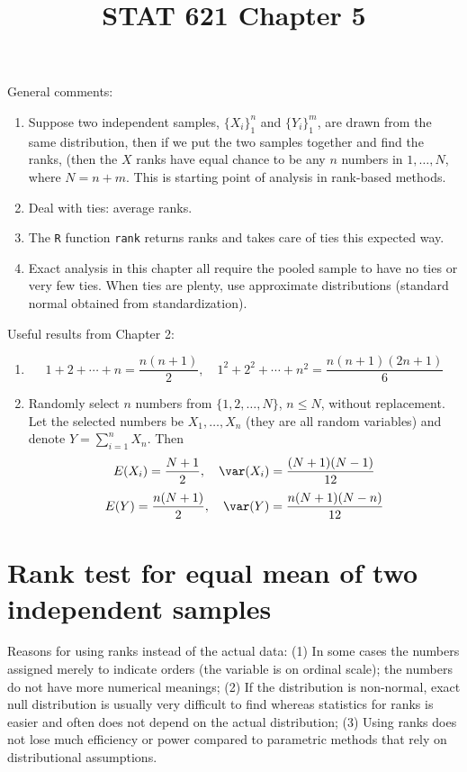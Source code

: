 \documentclass[12pt]{article}
\begin{document}
\title{STAT 621 Chapter 5}
\maketitle

General comments:
\begin{enumerate}
\item Suppose two independent samples,
    $\{X_i\}_1^n$ and $\{Y_i\}_1^m$,
    are drawn from the same distribution, then
    if we put the two samples together and find the ranks,
    (then the $X$ ranks have equal chance to be any
    $n$ numbers in $1,\dotsc,N$, where $N=n+m$.
    This is starting point of analysis in rank-based methods.
\item Deal with ties: average ranks.
\item The \texttt{R} function \texttt{rank} returns ranks
    and takes care of ties this expected way.
\item Exact analysis in this chapter all require the pooled sample to
    have no ties or very few ties.
    When ties are plenty, use approximate distributions
    (standard normal obtained from standardization).
\end{enumerate}

Useful results from Chapter 2:
\begin{enumerate}
\item
\[
1 + 2 +\dotsb + n = \frac{n(n+1)}{2},
\quad
1^2 + 2^2 +\dotsb+ n^2 = \frac{n(n+1)(2n + 1)}{6}
\]

\item
Randomly select $n$ numbers from
$\{1,2,\dotsc,N\}$, $n \le N$, without replacement.
Let the selected numbers be
$X_1,\dotsc, X_n$ (they are all random variables)
and denote
$Y = \sum_{i=1}^n X_n$.
Then
\[
E(X_i) = \frac{N+1}{2},
\quad
\var(X_i) = \frac{(N+1)(N-1)}{12}
\]
\[
E(Y) = \frac{n(N+1)}{2},
\quad
\var(Y) = \frac{n(N+1)(N-n)}{12}
\]


\end{enumerate}


\section{Rank test for equal mean of two independent samples}

Reasons for using ranks instead of the actual data:
(1) In some cases the numbers assigned merely to indicate orders
(the variable is on ordinal scale); the numbers do not have more
numerical meanings;
(2) If the distribution is non-normal, exact null distribution is
usually very difficult to find whereas statistics for ranks is easier
and often does not depend on the actual distribution;
(3) Using ranks does not lose much efficiency or power compared to
parametric methods that rely on distributional assumptions.
\end{document}

